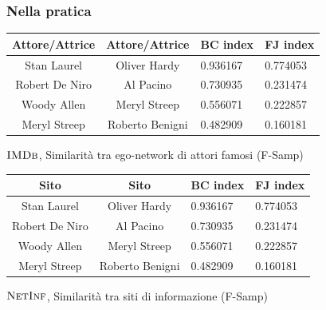 \begin{frame}
	\frametitle{Nella pratica}
	\centering
	\begin{table}[h]
		\centering
		\begin{tabular}{c|c|l|l}
			Attore/Attrice & Attore/Attrice  & BC index & FJ index \\ 
			\hline
			Stan Laurel    & Oliver Hardy    & 0.936167 & 0.774053 \\
			Robert De Niro & Al Pacino       & 0.730935 & 0.231474 \\
			Woody Allen    & Meryl Streep    & 0.556071 & 0.222857 \\
			Meryl Streep   & Roberto Benigni & 0.482909 & 0.160181 \\
		\end{tabular}
		\medskip
		
		$\textsc{IMDb}$, Similarità tra ego-network di attori famosi (F-Samp)
	\end{table}


	\begin{table}[h]
		\centering
		\begin{tabular}{c|c|l|l}
			Sito           & Sito            & BC index & FJ index \\ 
			\hline
			Stan Laurel    & Oliver Hardy    & 0.936167 & 0.774053 \\
			Robert De Niro & Al Pacino       & 0.730935 & 0.231474 \\
			Woody Allen    & Meryl Streep    & 0.556071 & 0.222857 \\
			Meryl Streep   & Roberto Benigni & 0.482909 & 0.160181 \\
		\end{tabular}
		\medskip
		
		$\textsc{NetInf}$, Similarità tra siti di informazione (F-Samp)
	\end{table}

\end{frame}

